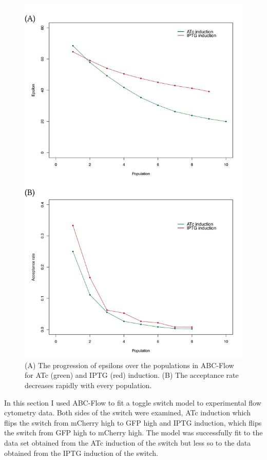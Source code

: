 \begin{figure}[tb]
\centerfloat
	\includegraphics[scale=0.7]{../../chapters/chapterABCFlow/images/epsilon_acceptance.png}
	\caption[LoF caption]{\label{fig:epsilon_accept}(A) The progression of epsilons over the populations in ABC-Flow for ATc (green) and IPTG (red) induction. (B) The acceptance rate decreases rapidly with every population.}
\end{figure}

In this section I used ABC-Flow to fit a toggle switch model to experimental flow cytometry data. Both sides of the switch were examined, ATc induction which flips the switch from mCherry high to GFP high and IPTG induction, which flips the switch from GFP high to mCherry high. The model was successfully fit to the data set obtained from the ATc induction of the switch but less so to the data obtained from the IPTG induction of the switch. 

